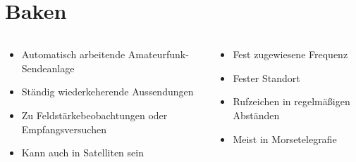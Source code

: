 
\section{Baken}
\label{section:baken}
\begin{frame}%

\begin{columns}
    \begin{column}{0.48\textwidth}
    \begin{itemize}
  \item Automatisch arbeitende Amateurfunk-Sendeanlage
  \item Ständig wiederkeherende Aussendungen
  \item Zu Feldstärkebeobachtungen oder Empfangsversuchen
  \item Kann auch in Satelliten sein
  \end{itemize}

    \end{column}
   \begin{column}{0.48\textwidth}
       \begin{itemize}
  \item Fest zugewiesene Frequenz
  \item Fester Standort
  \item Rufzeichen in regelmäßigen Abständen
  \item Meist in Morsetelegrafie
  \end{itemize}

   \end{column}
\end{columns}

\end{frame}

